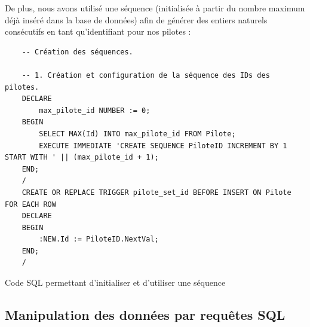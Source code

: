 \documentclass[12pt,a4paper]{article}
\newenvironment{code}{\captionsetup{type=listing}}{}
\begin{document}
De plus, nous avons utilisé une séquence (initialisée à partir du nombre maximum
déjà inséré dans la base de données) afin de générer des entiers naturels
consécutifs en tant qu'identifiant pour nos pilotes :

\begin{code}
    \begin{verbatim}
    -- Création des séquences.

    -- 1. Création et configuration de la séquence des IDs des pilotes.
    DECLARE
        max_pilote_id NUMBER := 0;
    BEGIN
        SELECT MAX(Id) INTO max_pilote_id FROM Pilote;
        EXECUTE IMMEDIATE 'CREATE SEQUENCE PiloteID INCREMENT BY 1 START WITH ' || (max_pilote_id + 1);
    END; 
    /
    CREATE OR REPLACE TRIGGER pilote_set_id BEFORE INSERT ON Pilote FOR EACH ROW
    DECLARE
    BEGIN
        :NEW.Id := PiloteID.NextVal;
    END;
    /
    \end{verbatim}
    \caption{Code SQL permettant d'initialiser et d'utiliser une séquence}
    \label{lst.seq}
\end{code}

\subsection{Manipulation des données par requêtes SQL}
\label{sub.req}
\end{document}
